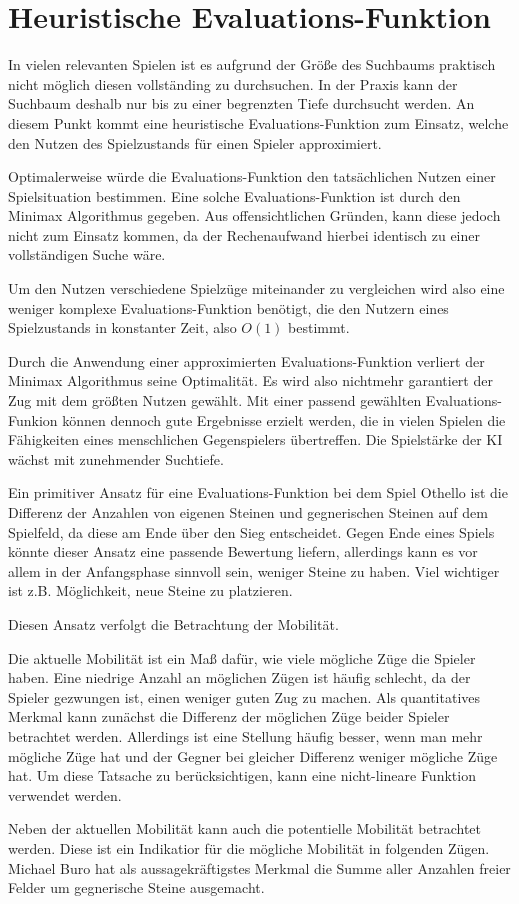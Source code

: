 \section{Heuristische Evaluations-Funktion}

In vielen relevanten Spielen ist es aufgrund der Größe des Suchbaums praktisch nicht möglich diesen vollständing zu durchsuchen.
In der Praxis kann der Suchbaum deshalb nur bis zu einer begrenzten Tiefe durchsucht werden. An diesem Punkt kommt eine heuristische Evaluations-Funktion zum Einsatz,
welche den Nutzen des Spielzustands für einen Spieler approximiert.
\cite[S.~171]{ai2010russel}

Optimalerweise würde die Evaluations-Funktion den tatsächlichen Nutzen einer Spielsituation bestimmen. Eine solche Evaluations-Funktion ist durch den Minimax Algorithmus gegeben.
Aus offensichtlichen Gründen, kann diese jedoch nicht zum Einsatz kommen, da der Rechenaufwand hierbei identisch zu einer vollständigen Suche wäre.

Um den Nutzen verschiedene Spielzüge miteinander zu vergleichen wird also eine weniger komplexe Evaluations-Funktion benötigt, die den Nutzern eines Spielzustands in konstanter Zeit, also \(O(1)\) bestimmt.

Durch die Anwendung einer approximierten Evaluations-Funktion verliert der Minimax Algorithmus seine Optimalität. Es wird also nichtmehr garantiert der Zug mit dem größten Nutzen gewählt.
Mit einer passend gewählten Evaluations-Funkion können dennoch gute Ergebnisse erzielt werden, die in vielen Spielen die Fähigkeiten eines menschlichen Gegenspielers übertreffen.
Die Spielstärke der KI wächst mit zunehmender Suchtiefe.


Ein primitiver Ansatz für eine Evaluations-Funktion bei dem Spiel Othello ist die Differenz der Anzahlen von eigenen Steinen und gegnerischen Steinen auf dem Spielfeld, da diese am Ende über den Sieg entscheidet.
Gegen Ende eines Spiels könnte dieser Ansatz eine passende Bewertung liefern, allerdings kann es vor allem in der Anfangsphase sinnvoll sein, weniger Steine zu haben.
Viel wichtiger ist z.B. Möglichkeit, neue Steine zu platzieren.

Diesen Ansatz verfolgt die Betrachtung der Mobilität.

Die aktuelle Mobilität ist ein Maß dafür, wie viele mögliche Züge die Spieler haben.
Eine niedrige Anzahl an möglichen Zügen ist häufig schlecht, da der Spieler gezwungen ist, einen weniger guten Zug zu machen.
Als quantitatives Merkmal kann zunächst die Differenz der möglichen Züge beider Spieler betrachtet werden.
Allerdings ist eine Stellung häufig besser, wenn man mehr mögliche Züge hat und der Gegner bei gleicher Differenz weniger mögliche Züge hat.
Um diese Tatsache zu berücksichtigen, kann eine nicht-lineare Funktion verwendet werden.
\cite[S. 7]{evaluationfunctions}

Neben der aktuellen Mobilität kann auch die potentielle Mobilität betrachtet werden.
Diese ist ein Indikatior für die mögliche Mobilität in folgenden Zügen.
Michael Buro hat als aussagekräftigstes Merkmal die Summe aller Anzahlen freier Felder um gegnerische Steine ausgemacht.
\cite[S. 8f.]{evaluationfunctions}

